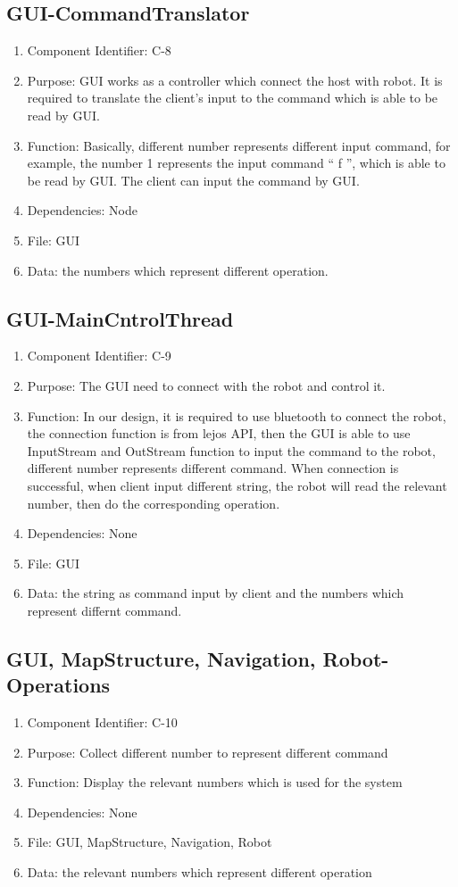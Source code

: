\documentclass[11pt, a4paper]{report}
\begin{document}
\subsection{GUI-CommandTranslator}
\begin{enumerate}
\item Component Identifier: C-8
\item Purpose: GUI works as a controller which connect the host with robot. It is required to translate the client's input to the command which is able to be read by GUI. 
\item Function: Basically, different number represents different input command, for example, the number 1 represents the input command `` f '', which is able to be read by GUI. The client can input the command by GUI. 
\item Dependencies: Node
\item File: GUI
\item Data: the numbers which represent different operation.
\end{enumerate}

\subsection{GUI-MainCntrolThread}
\begin{enumerate}
\item Component Identifier: C-9
\item Purpose: The GUI need to connect with the robot and control it.
\item Function: In our design, it is required to use bluetooth to connect the robot, the connection function is from lejos API, then the GUI is able to use InputStream and OutStream function to input the command to the robot, different number represents different command. When connection is successful, when client input different string, the robot will read the relevant number, then do the corresponding operation.   
\item Dependencies: None
\item File: GUI
\item Data: the string as command input by client and the numbers which represent differnt command. 
\end{enumerate}

\subsection{GUI, MapStructure, Navigation, Robot-Operations}
\begin{enumerate}
\item Component Identifier: C-10
\item Purpose: Collect different number to represent different command
\item Function: Display the relevant numbers which is used for the system
\item Dependencies: None
\item File: GUI, MapStructure, Navigation, Robot
\item Data: the relevant numbers which represent different operation
\end{enumerate}
\end{document}
